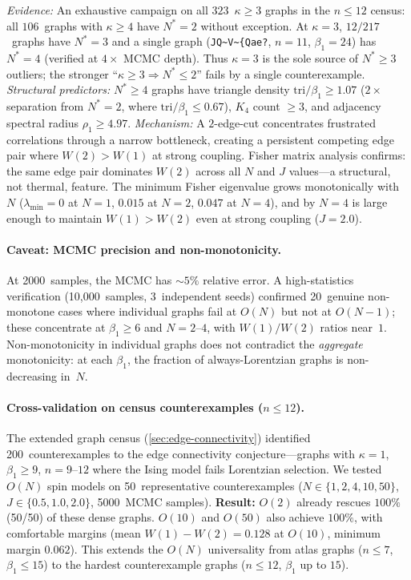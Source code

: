 \documentclass[11pt]{article}
\theoremstyle{definition}
\theoremstyle{remark}
\begin{document}
\noindent\emph{Evidence:} An exhaustive campaign on all $323$~$\kappa \geq 3$
graphs in the $n \leq 12$ census: all $106$~graphs with $\kappa \geq 4$ have
$N^* = 2$ without exception. At $\kappa = 3$, $12/217$~graphs have $N^* = 3$
and a single graph (\texttt{JQ\~{}V\~{}\{Qae?}, $n = 11$, $\beta_1 = 24$)
has $N^* = 4$ (verified at $4\times$ MCMC depth). Thus $\kappa = 3$ is the
sole source of $N^* \geq 3$ outliers; the stronger ``$\kappa \geq 3 \Rightarrow
N^* \leq 2$'' fails by a single counterexample.
\emph{Structural predictors:} $N^* \geq 4$ graphs have triangle density
$\mathrm{tri}/\beta_1 \geq 1.07$ ($2\times$ separation from $N^* = 2$,
where $\mathrm{tri}/\beta_1 \leq 0.67$), $K_4$ count $\geq 3$,
and adjacency spectral radius $\rho_1 \geq 4.97$.
\emph{Mechanism:} A $2$-edge-cut concentrates frustrated correlations through
a narrow bottleneck, creating a persistent competing edge pair where
$W(2) > W(1)$ at strong coupling.  Fisher matrix analysis confirms:
the same edge pair dominates $W(2)$ across all $N$ and $J$
values---a structural, not thermal, feature.  The minimum Fisher eigenvalue
grows monotonically with~$N$ ($\lambda_{\min} = 0$ at $N = 1$,
$0.015$ at $N = 2$, $0.047$ at $N = 4$), and by $N = 4$ is large enough
to maintain $W(1) > W(2)$ even at strong coupling ($J = 2.0$).

\paragraph{Caveat: MCMC precision and non-monotonicity.}
At 2000~samples, the MCMC has $\sim 5\%$ relative error.
A high-statistics verification (10{,}000~samples, 3~independent seeds)
confirmed 20~genuine non-monotone cases where individual graphs fail at
$O(N)$ but not at $O(N{-}1)$; these concentrate at $\beta_1 \geq 6$
and $N = 2$--$4$, with $W(1)/W(2)$ ratios near~$1$.
Non-monotonicity in individual graphs does not contradict the \emph{aggregate}
monotonicity: at each $\beta_1$, the fraction of always-Lorentzian graphs
is non-decreasing in~$N$.

\paragraph{Cross-validation on census counterexamples ($n \leq 12$).}
The extended graph census (\cref{sec:edge-connectivity}) identified
200~counterexamples to the edge connectivity conjecture---graphs with
$\kappa = 1$, $\beta_1 \geq 9$, $n = 9$--$12$ where the Ising model
fails Lorentzian selection. We tested $O(N)$ spin models on
50~representative counterexamples ($N \in \{1, 2, 4, 10, 50\}$,
$J \in \{0.5, 1.0, 2.0\}$, 5000~MCMC samples).
\textbf{Result:} $O(2)$ already rescues $100\%$ (50/50) of these
dense graphs. $O(10)$ and $O(50)$ also achieve $100\%$, with
comfortable margins (mean $W(1) - W(2) = 0.128$ at $O(10)$,
minimum margin $0.062$). This extends the $O(N)$ universality
from atlas graphs ($n \leq 7$, $\beta_1 \leq 15$) to the hardest
counterexample graphs ($n \leq 12$, $\beta_1$ up to $15$).
\end{document}
